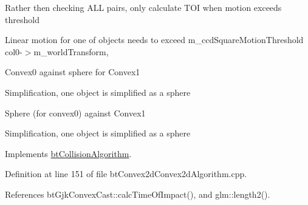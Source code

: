 Rather then checking ALL pairs, only calculate TOI when motion exceeds threshold

Linear motion for one of objects needs to exceed m\_\-ccdSquareMotionThreshold col0-$>$m\_\-worldTransform,

Convex0 against sphere for Convex1

Simplification, one object is simplified as a sphere

Sphere (for convex0) against Convex1

Simplification, one object is simplified as a sphere 

Implements \hyperlink{classbt_collision_algorithm}{btCollisionAlgorithm}.

Definition at line 151 of file btConvex2dConvex2dAlgorithm.cpp.

References btGjkConvexCast::calcTimeOfImpact(), and glm::length2().

